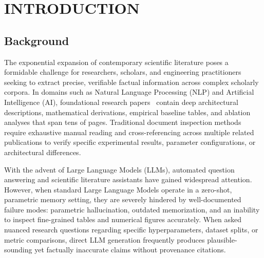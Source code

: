\chapter{INTRODUCTION}

\section{Background}
The exponential expansion of contemporary scientific literature poses a formidable challenge for researchers, scholars, and engineering practitioners seeking to extract precise, verifiable factual information across complex scholarly corpora. In domains such as Natural Language Processing (NLP) and Artificial Intelligence (AI), foundational research papers~\cite{vaswani2017attention, devlin2018bert} contain deep architectural descriptions, mathematical derivations, empirical baseline tables, and ablation analyses that span tens of pages. Traditional document inspection methods require exhaustive manual reading and cross-referencing across multiple related publications to verify specific experimental results, parameter configurations, or architectural differences.

With the advent of Large Language Models (LLMs), automated question answering and scientific literature assistants have gained widespread attention. However, when standard Large Language Models operate in a zero-shot, parametric memory setting, they are severely hindered by well-documented failure modes: parametric hallucination, outdated memorization, and an inability to inspect fine-grained tables and numerical figures accurately. When asked nuanced research questions regarding specific hyperparameters, dataset splits, or metric comparisons, direct LLM generation frequently produces plausible-sounding yet factually inaccurate claims without provenance citations.

